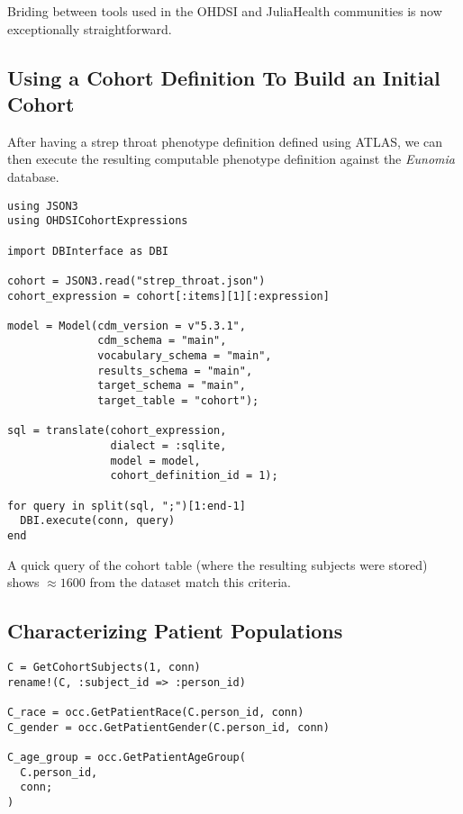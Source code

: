\documentclass{juliacon}
\begin{document}
Briding between tools used in the OHDSI and JuliaHealth communities is now exceptionally straightforward.


\subsection{Using a Cohort Definition To Build an Initial Cohort}

After having a strep throat phenotype definition defined using ATLAS, we can then execute the resulting computable phenotype definition against the \textit{Eunomia} database.

\begin{verbatim}
using JSON3 
using OHDSICohortExpressions

import DBInterface as DBI

cohort = JSON3.read("strep_throat.json")
cohort_expression = cohort[:items][1][:expression]

model = Model(cdm_version = v"5.3.1", 
              cdm_schema = "main",
              vocabulary_schema = "main", 
              results_schema = "main",
              target_schema = "main", 
              target_table = "cohort");

sql = translate(cohort_expression, 
                dialect = :sqlite, 
                model = model, 
                cohort_definition_id = 1);

for query in split(sql, ";")[1:end-1]
  DBI.execute(conn, query)
end
\end{verbatim}

A quick query of the cohort table (where the resulting subjects were stored) shows $\approx 1600$ from the dataset match this criteria.

\subsection{Characterizing Patient Populations}

\begin{verbatim}
C = GetCohortSubjects(1, conn)
rename!(C, :subject_id => :person_id)

C_race = occ.GetPatientRace(C.person_id, conn)
C_gender = occ.GetPatientGender(C.person_id, conn)

C_age_group = occ.GetPatientAgeGroup(
  C.person_id, 
  conn; 
)
\end{verbatim}
\end{document}
